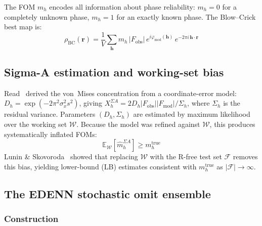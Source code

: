 \documentclass[10pt,twocolumn]{article}
\newcommand{\Fobs}{F_{\!\mathrm{obs}}}
\newcommand{\Fmod}{F_{\!\mathrm{mod}}}
\newcommand{\phimod}{\varphi_{\mathrm{mod}}}
\newcommand{\mh}{m_h}
\newcommand{\Xh}{X_h}
\newcommand{\rhoBC}{\rho_{\mathrm{BC}}}
\newcommand{\Eop}{\mathbb{E}}
\newcommand{\boldh}{\mathbf{h}}
\newcommand{\boldr}{\mathbf{r}}
\begin{document}
\noindent The FOM $\mh$ encodes all information about phase reliability:
$\mh=0$ for a completely unknown phase, $\mh=1$ for an exactly known
phase.  The Blow--Crick best map is:
\begin{equation}
  \rhoBC(\boldr)
  = \frac{1}{V}\sum_{\boldh}
    \mh\,|\Fobs|\,e^{i\phimod(\boldh)}\,e^{-2\pi i\,\boldh\cdot\boldr}
  \label{eq:bc}
\end{equation}

\subsection{Sigma-A estimation and working-set bias}

Read~\cite{read1986} derived the von~Mises concentration from a
coordinate-error model: $D_h = \exp(-2\pi^2\sigma_x^2 s^2)$,
giving $\Xh^{\Sigma A} = 2D_h|\Fobs||\Fmod|/\Sigma_h$, where
$\Sigma_h$ is the residual variance.  Parameters $(D_h,\Sigma_h)$
are estimated by maximum likelihood over the working set
$\mathcal{W}$.  Because the model was refined against $\mathcal{W}$,
this produces systematically inflated FOMs:
\begin{equation}
  \Eop_\mathcal{W}[\hat m_h^{\Sigma A}] \geq m_h^{\mathrm{true}}
  \label{eq:sigmaa_bias}
\end{equation}
Lunin \& Skovoroda~\cite{lunin1995} showed that replacing
$\mathcal{W}$ with the R-free test set $\mathcal{F}$
removes this bias, yielding lower-bound (LB) estimates consistent
with $m_h^{\mathrm{true}}$ as $|\mathcal{F}|\to\infty$.

\subsection{The EDENN stochastic omit ensemble}

\subsubsection{Construction}
\end{document}
